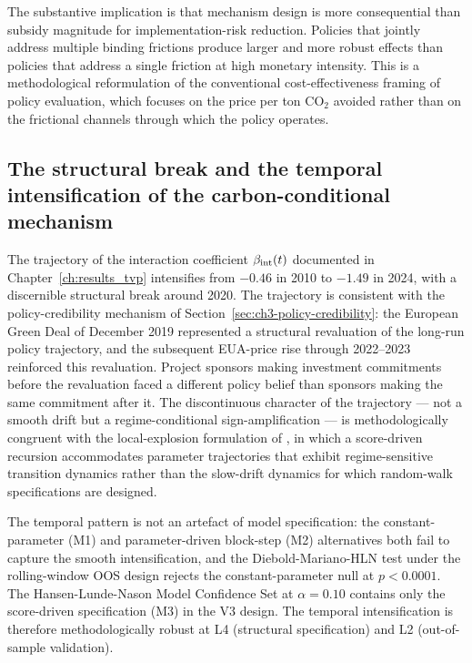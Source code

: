 The substantive implication is that mechanism design is more consequential than subsidy magnitude for implementation-risk reduction. Policies that jointly address multiple binding frictions produce larger and more robust effects than policies that address a single friction at high monetary intensity. This is a methodological reformulation of the conventional cost-effectiveness framing of policy evaluation, which focuses on the price per ton CO$_2$ avoided rather than on the frictional channels through which the policy operates.

\subsection{The structural break and the temporal intensification of the carbon-conditional mechanism}
\label{sec:ch10-substantive-structural-break}

The trajectory of the interaction coefficient $\beta_{\mathrm{int}}(t)$ documented in Chapter~\ref{ch:results_tvp} intensifies from $-0.46$ in 2010 to $-1.49$ in 2024, with a discernible structural break around 2020. The trajectory is consistent with the policy-credibility mechanism of Section~\ref{sec:ch3-policy-credibility}: the European Green Deal of December 2019 represented a structural revaluation of the long-run policy trajectory, and the subsequent EUA-price rise through 2022--2023 reinforced this revaluation. Project sponsors making investment commitments before the revaluation faced a different policy belief than sponsors making the same commitment after it. The discontinuous character of the trajectory --- not a smooth drift but a regime-conditional sign-amplification --- is methodologically congruent with the local-explosion formulation of \cite{blasques2022local}, in which a score-driven recursion accommodates parameter trajectories that exhibit regime-sensitive transition dynamics rather than the slow-drift dynamics for which random-walk specifications are designed.

The temporal pattern is not an artefact of model specification: the constant-parameter (M1) and parameter-driven block-step (M2) alternatives both fail to capture the smooth intensification, and the Diebold-Mariano-HLN test under the rolling-window OOS design rejects the constant-parameter null at $p < 0.0001$. The Hansen-Lunde-Nason Model Confidence Set at $\alpha = 0.10$ contains only the score-driven specification (M3) in the V3 design. The temporal intensification is therefore methodologically robust at L4 (structural specification) and L2 (out-of-sample validation).

